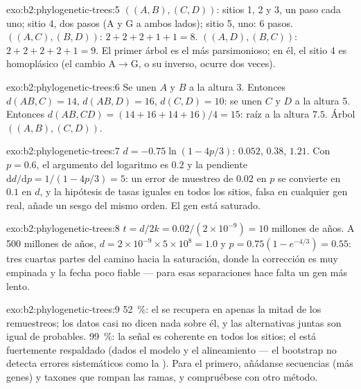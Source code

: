 \begin{solution}{exo:b2:phylogenetic-trees:5}
$((A,B),(C,D))$: sitios 1, 2 y 3, un paso cada uno; sitio 4, dos pasos
($\mathrm{A}$ y $\mathrm{G}$ a ambos lados); sitio 5, uno: 6 pasos.
$((A,C),(B,D))$: $2 + 2 + 2 + 1 + 1 = 8$. $((A,D),(B,C))$: $2 + 2 + 2 +
2 + 1 = 9$. El primer árbol es el más parsimonioso; en él, el sitio 4 es
homoplásico (el cambio $\mathrm{A}\to\mathrm{G}$, o su inverso, ocurre dos
veces).
\end{solution}

\begin{solution}{exo:b2:phylogenetic-trees:6}
Se unen $A$ y $B$ a la altura 3. Entonces $d(AB,C) = 14$, $d(AB,D) = 16$,
$d(C,D) = 10$: se unen $C$ y $D$ a la altura 5. Entonces $d(AB,CD) = (14 + 16
+ 14 + 16)/4 = 15$: raíz a la altura $7.5$. Árbol $((A,B),(C,D))$.
\end{solution}

\begin{solution}{exo:b2:phylogenetic-trees:7}
$d = -0.75\ln(1 - 4p/3)$: $0.052$, $0.38$, $1.21$. Con $p = 0.6$, el
argumento del logaritmo es $0.2$ y la pendiente $\mathrm{d}d/\mathrm{d}p
= 1/(1 - 4p/3) = 5$: un error de muestreo de $0.02$ en $p$ se convierte en
$0.1$ en $d$, y la hipótesis de tasas iguales en todos los sitios, falsa en
cualquier gen real, añade un sesgo del mismo orden. El gen está saturado.
\end{solution}

\begin{solution}{exo:b2:phylogenetic-trees:8}
$t = d/2k = 0.02/(2\times 10^{-9}) = 10$ millones de años. A 500
millones de años, $d = 2\times 10^{-9}\times 5\times 10^{8} = 1.0$ y
$p = 0.75(1 - e^{-4/3}) = 0.55$: tres cuartas partes del camino hacia la
saturación, donde la corrección es muy empinada y la fecha poco fiable
--- para esas separaciones hace falta un gen más lento.
\end{solution}

\begin{solution}{exo:b2:phylogenetic-trees:9}
\qty{52}{\%}: el  se recupera en apenas la mitad de los remuestreos;
los datos casi no dicen nada sobre él, y las alternativas juntas son
igual de probables. \qty{99}{\%}: la señal es coherente en todos los
sitios; el  está fuertemente respaldado (dados el modelo y el
alineamiento --- el bootstrap no detecta errores sistemáticos como la
). Para el primero, añádanse secuencias (más
genes) y taxones que rompan las ramas, y compruébese con otro método.
\end{solution}


